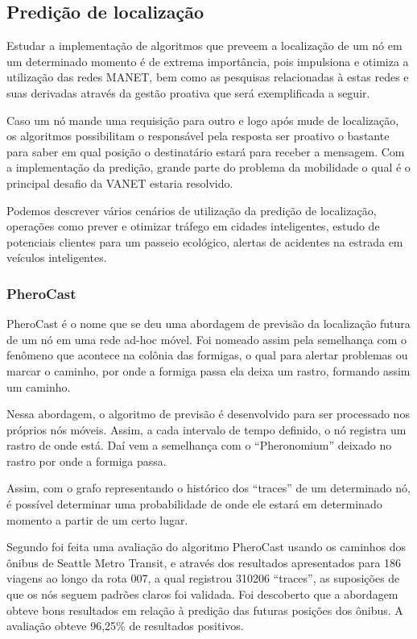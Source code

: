 \documentclass[12pt, %
openright, 
oneside,
a4paper,
brazil]{facom-ufu-abntex2}
\begin{document}
\subsection{Predição de localização}
Estudar a implementação de algoritmos que preveem a localização de um nó em um determinado momento é de extrema importância, pois impulsiona e otimiza a utilização das redes \ac{MANET}, bem como as pesquisas relacionadas à estas redes e suas derivadas através da gestão proativa que será exemplificada a seguir.  \cite{6838650}

Caso um nó mande uma requisição para outro e logo após mude de localização, os algoritmos possibilitam o responsável pela resposta ser proativo o bastante para saber em qual posição o destinatário estará para receber a mensagem. Com a implementação da predição, grande parte do problema da mobilidade o qual é o principal desafio da \ac{VANET} estaria resolvido.

Podemos descrever vários cenários de utilização da predição de localização, operações como prever e otimizar tráfego em cidades inteligentes, estudo de potenciais clientes para um passeio ecológico, alertas de acidentes na estrada em veículos inteligentes.

\subsubsection{PheroCast}
PheroCast é o nome que se deu uma abordagem de previsão da localização futura de um nó em uma rede ad-hoc móvel. Foi nomeado assim pela semelhança com o fenômeno que acontece na colônia das formigas, o qual para alertar problemas ou marcar o caminho, por onde a formiga passa ela deixa um rastro, formando assim um caminho.

Nessa abordagem, o algoritmo de previsão é desenvolvido para ser processado nos próprios nós móveis. Assim, a cada intervalo de tempo definido, o nó registra um rastro de onde está. Daí vem a semelhança com o ``Pheronomium'' deixado no rastro por onde a formiga passa.

Assim, com o grafo representando o histórico dos ``traces'' de um determinado nó, é possível determinar uma probabilidade de onde ele estará em determinado momento a partir de um certo lugar.


Segundo \cite{fynn} foi feita uma avaliação do algoritmo PheroCast usando os caminhos dos ônibus de Seattle Metro Transit, e através dos resultados apresentados para 186 viagens ao longo da rota 007, a qual registrou 310206 ``traces'', as suposições de que os nós seguem padrões claros foi validada. Foi descoberto que a abordagem obteve bons resultados em relação à predição das futuras posições dos ônibus. A avaliação obteve 96,25\% de resultados positivos. 
\end{document}
